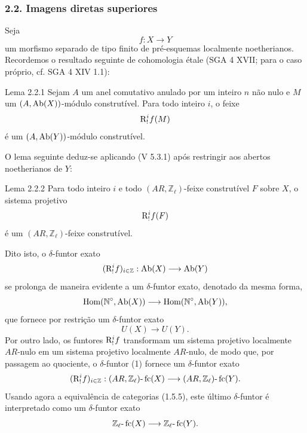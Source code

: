 \subsubsection*{2.2. Imagens diretas superiores}

Seja
\[
f:X\longrightarrow Y
\]
um morfismo separado de tipo finito de pré-esquemas localmente noetherianos. Recordemos o resultado seguinte de cohomologia étale (SGA 4 XVII; para o caso próprio, cf. SGA 4 XIV 1.1):

\begin{statement}{Lema 2.2.1}
Sejam \(A\) um anel comutativo anulado por um inteiro \(n\) não nulo e \(M\) um \((A,\operatorname{Ab}(X))\)-módulo construtível. Para todo inteiro \(i\), o feixe
\[
\mathrm{R}^i_!f(M)
\]
é um \((A,\operatorname{Ab}(Y))\)-módulo construtível.
\end{statement}

O lema seguinte deduz-se aplicando (V 5.3.1) após restringir aos abertos noetherianos de \(Y\):

\begin{statement}{Lema 2.2.2}
Para todo inteiro \(i\) e todo \((AR,\mathbb Z_\ell)\)-feixe construtível \(F\) sobre \(X\), o sistema projetivo
\[
\mathrm{R}^i_!f(F)
\]
é um \((AR,\mathbb Z_\ell)\)-feixe construtível.
\end{statement}

Dito isto, o \(\delta\)-funtor exato
\[
(\mathrm{R}^i_!f)_{i\in\mathbb Z}:\operatorname{Ab}(X)\longrightarrow \operatorname{Ab}(Y)
\]
se prolonga de maneira evidente a um \(\delta\)-funtor exato, denotado da mesma forma,
\[
\operatorname{Hom}(\mathbb N^\circ,\operatorname{Ab}(X))\longrightarrow \operatorname{Hom}(\mathbb N^\circ,\operatorname{Ab}(Y)),
\]
que fornece por restrição um \(\delta\)-funtor exato
\[
U(X)\longrightarrow U(Y).
\tag{1}
\]
Por outro lado, os funtores \(\mathrm{R}^i_!f\) transformam um sistema projetivo localmente \(AR\)-nulo em um sistema projetivo localmente \(AR\)-nulo, de modo que, por passagem ao quociente, o \(\delta\)-funtor (1) fornece um \(\delta\)-funtor exato%
\[
(\mathrm{R}^i_!f)_{i\in\mathbb Z}:(AR,\mathbb Z_\ell)\text{-}\operatorname{fc}(X)
\longrightarrow (AR,\mathbb Z_\ell)\text{-}\operatorname{fc}(Y).
\]
Usando agora a equivalência de categorias (1.5.5), este último \(\delta\)-funtor é interpretado como um \(\delta\)-funtor exato
\[
\mathbb Z_\ell\text{-}\operatorname{fc}(X)\longrightarrow \mathbb Z_\ell\text{-}\operatorname{fc}(Y).
\]

